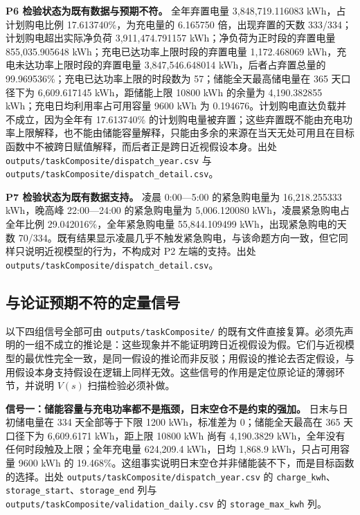 \begin{appendices}
\textbf{P6 检验状态为既有数据与预期不符。} 全年弃置电量 3,848,719.116083 kWh，占计划购电比例 17.613740\%，为充电量的 6.165750 倍，出现弃置的天数 333/334；计划购电超出实际净负荷 3,911,474.791157 kWh；净负荷为正时段的弃置电量 855,035.905648 kWh；充电已达功率上限时段的弃置电量 1,172.468069 kWh，充电未达功率上限时段的弃置电量 3,847,546.648014 kWh，后者占弃置总量的 99.969536\%；充电已达功率上限的时段数为 57；储能全天最高储电量在 365 天口径下为 6,609.617145 kWh，距储能上限 10800 kWh 的余量为 4,190.382855 kWh；充电日均利用率占可用容量 9600 kWh 为 0.194676。计划购电直达负载并不成立，因为全年有 17.613740\% 的计划购电量被弃置；这些弃置既不能由充电功率上限解释，也不能由储能容量解释，只能由多余的来源在当天无处可用且在目标函数中不被跨日赋值解释，而后者正是跨日近视假设本身。出处 \texttt{outputs/\allowbreak taskComposite/\allowbreak dispatch\_year.csv} 与 \texttt{outputs/\allowbreak taskComposite/\allowbreak dispatch\_detail.csv}。

\textbf{P7 检验状态为既有数据支持。} 凌晨 0:00---5:00 的紧急购电量为 16,218.255333 kWh，晚高峰 22:00---24:00 的紧急购电量为 5,006.120080 kWh，凌晨紧急购电占全年比例 29.042016\%，全年紧急购电量 55,844.109499 kWh，出现紧急购电的天数 70/334。既有结果显示凌晨几乎不触发紧急购电，与该命题方向一致，但它同样只说明近视模型的行为，不构成对 P2 左端的支持。出处 \texttt{outputs/\allowbreak taskComposite/\allowbreak dispatch\_detail.csv}。

\subsection{与论证预期不符的定量信号}

以下四组信号全部可由 \texttt{outputs/\allowbreak taskComposite/} 的既有文件直接复算。必须先声明的一组不成立的推论是：这些现象并不能证明跨日近视假设为假。它们与近视模型的最优性完全一致，是同一假设的推论而非反驳；用假设的推论去否定假设，与用假设本身支持假设在逻辑上同样无效。这些信号的作用是定位原论证的薄弱环节，并说明 $V(s)$ 扫描检验必须补做。

\textbf{信号一：储能容量与充电功率都不是瓶颈，日末空仓不是约束的强加。} 日末与日初储电量在 334 天全部等于下限 1200 kWh，标准差为 0；储能全天最高在 365 天口径下为 6,609.6171 kWh，距上限 10800 kWh 尚有 4,190.3829 kWh，全年没有任何时段触及上限；全年充电量 624,209.4 kWh，日均 1,868.9 kWh，只占可用容量 9600 kWh 的 19.468\%。这组事实说明日末空仓并非储能装不下，而是目标函数的选择。出处 \texttt{outputs/\allowbreak taskComposite/\allowbreak dispatch\_year.csv} 的 \texttt{charge\_kwh}、\texttt{storage\_start}、\texttt{storage\_end} 列与 \texttt{outputs/\allowbreak taskComposite/\allowbreak validation\_daily.csv} 的 \texttt{storage\_max\_kwh} 列。


\end{appendices}
